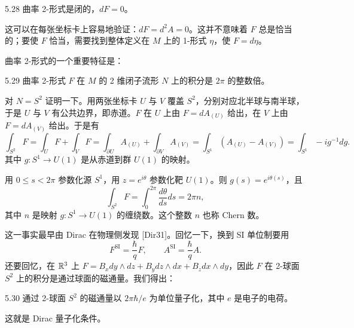 \begin{proposition}{5.28}
  曲率 2-形式是闭的，$dF=0$。
\end{proposition}

这可以在每张坐标卡上容易地验证：$dF=d^2A=0$。这并不意味着 $F$ 总是恰当的；要使 $F$ 恰当，需要找到整体定义在 $M$ 上的 1-形式 $\eta$，使 $F=d\eta$。

曲率 2-形式的一个重要特征是：

\begin{proposition}{5.29}
  曲率 2-形式 $F$ 在 $M$ 的 2 维闭子流形 $N$ 上的积分是 $2\pi$ 的整数倍。
\end{proposition}

对 $N=S^2$ 证明一下。用两张坐标卡 $U$ 与 $V$ 覆盖 $S^2$，分别对应北半球与南半球，于是 $U$ 与 $V$ 有公共边界，即赤道。$F$ 在 $U$ 上由 $F=dA_{(U)}$ 给出，在 $V$ 上由 $F=dA_{(V)}$ 给出。于是有
\begin{equation}
  \int_{S^2}F=\int_UF+\int_VF=\int_{\partial U}A_{(U)}+\int_{\partial V}A_{(V)}
  =\int_{S^1}(A_{(U)}-A_{(V)})=\int_{S^1}-ig^{-1}dg.
  \tag{5.73}
\end{equation}
其中 $g:S^1\to U(1)$ 是从赤道到群 $U(1)$ 的映射。

用 $0\le s<2\pi$ 参数化源 $S^1$，用 $z=e^{i\theta}$ 参数化靶 $U(1)$。则 $g(s)=e^{i\theta(s)}$，且
\begin{equation}
  \int_{S^2}F=\int_0^{2\pi}\frac{d\theta}{ds}ds=2\pi n,
  \tag{5.74}
\end{equation}
其中 $n$ 是映射 $g:S^1\to U(1)$ 的缠绕数。这个整数 $n$ 也称 Chern 数。

这一事实最早由 Dirac 在物理侧发现 [Dir31]。回忆一下，换到 SI 单位制要用
\begin{equation}
  F^{\mathrm{SI}}=\frac{\hbar}{q}F,\qquad A^{\mathrm{SI}}=\frac{\hbar}{q}A.
  \tag{5.75}
\end{equation}
还要回忆，在 $\mathbb{R}^3$ 上 $F=B_xdy\wedge dz+B_ydz\wedge dx+B_zdx\wedge dy$，因此 $F$ 在 2-球面 $S^2$ 上的积分是通过球面的磁通量。我们得出：

\begin{proposition}{5.30}
  通过 2-球面 $S^2$ 的磁通量以 $2\pi\hbar/e$ 为单位量子化，其中 $e$ 是电子的电荷。
\end{proposition}

这就是 Dirac 量子化条件。

